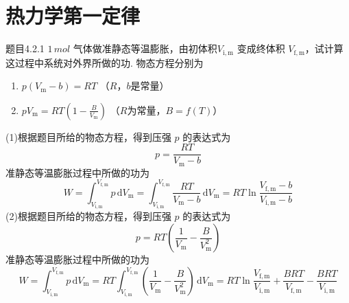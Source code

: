 \section{热力学第一定律}
\begin{question}{题目4.2.1}
    $1 \,\si{mol}$ 气体做准静态等温膨胀，由初体积$V_\mathrm{i,m}$ 变成终体积 $V_\mathrm{f,m}$，试计算这过程中系统对外界所做的功. 物态方程分别为
    \begin{enumerate}
        \item[(1)] $p(V_\mathrm{m} - b) = RT$ （$R$，$b$是常量）
        \item[(2)] $pV_\mathrm{m} = RT\left(1-\frac{B}{V_\mathrm{m}}\right)$ （$R$为常量，$B = f(T)$）
    \end{enumerate}
\end{question}

\begin{solution}
    (1)根据题目所给的物态方程，得到压强 $p$ 的表达式为
    $$
        p = \frac{RT}{V_\mathrm{m} - b}
    $$
    准静态等温膨胀过程中所做的功为
    $$
        W = \int_{V_\mathrm{i,m}}^{V_\mathrm{f,m}} p \,\mathrm{d}V_\mathrm{m}
        = \int_{V_\mathrm{i,m}}^{V_\mathrm{f,m}} \frac{RT}{V_\mathrm{m} - b} \,\mathrm{d}V_\mathrm{m}
        = RT\ln\frac{V_\mathrm{f,m} - b}{V_\mathrm{i,m} - b}
    $$
    (2)根据题目所给的物态方程，得到压强 $p$ 的表达式为
    $$
        p = RT\left(\frac{1}{V_\mathrm{m}} - \frac{B}{V_\mathrm{m}^2}\right)
    $$
    准静态等温膨胀过程中所做的功为
    $$
        W = \int_{V_\mathrm{i,m}}^{V_\mathrm{f,m}} p \,\mathrm{d}V_\mathrm{m}
        = RT \int_{V_\mathrm{i,m}}^{V_\mathrm{f,m}} \left(\frac{1}{V_\mathrm{m}} - \frac{B}{V_\mathrm{m}^2} \right) \,\mathrm{d}V_\mathrm{m}
        = RT\ln\frac{V_\mathrm{f,m}}{V_\mathrm{i,m}} + \frac{BRT}{V_\mathrm{f,m}} - \frac{BRT}{V_\mathrm{i,m}}
    $$
\end{solution}

